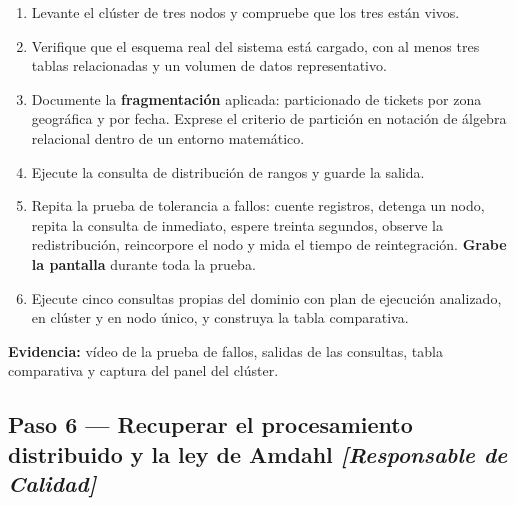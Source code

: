 \documentclass[11pt,a4paper]{article}
\newcommand{\paso}[1]{\subsection{#1}}
\begin{document}
	\begin{enumerate}[leftmargin=*,itemsep=4pt]
		\item Levante el clúster de tres nodos y compruebe que los tres están vivos.
		\item Verifique que el esquema real del sistema está cargado, con al menos tres tablas relacionadas y un volumen de datos representativo.
		\item Documente la \textbf{fragmentación} aplicada: particionado de tickets por zona geográfica y por fecha. Exprese el criterio de partición en notación de álgebra relacional dentro de un entorno matemático.
		\item Ejecute la consulta de distribución de rangos y guarde la salida.
		\item Repita la prueba de tolerancia a fallos: cuente registros, detenga un nodo, repita la consulta de inmediato, espere treinta segundos, observe la redistribución, reincorpore el nodo y mida el tiempo de reintegración. \textbf{Grabe la pantalla} durante toda la prueba.
		\item Ejecute cinco consultas propias del dominio con plan de ejecución analizado, en clúster y en nodo único, y construya la tabla comparativa.
	\end{enumerate}
	
	\textbf{Evidencia:} vídeo de la prueba de fallos, salidas de las consultas, tabla comparativa y captura del panel del clúster.
	
	\paso{Paso 6 --- Recuperar el procesamiento distribuido y la ley de Amdahl \emph{[Responsable de Calidad]}}
	
\end{document}
